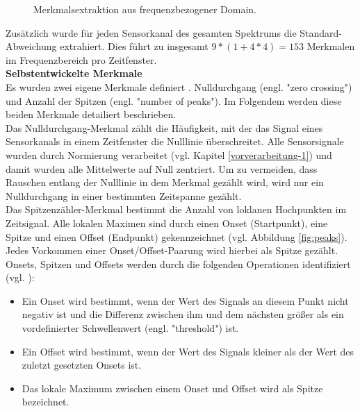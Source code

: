 \begin{figure}[h] 
\caption[Merkmalsextraktion aus frequenzbezogener Domain]{ Merkmalsextraktion aus frequenzbezogener Domain. } 
\label{fig:fft} \end{figure} \vspace{0.5cm}


Zusätzlich wurde für jeden Sensorkanal des gesamten Spektrums die Standard-Abweichung  extrahiert. Dies führt zu insgesamt $9 \ast (1 + 4 \ast 4) = 153$ Merkmalen im Frequenzbereich pro Zeitfenster. \\


\textbf{Selbstentwickelte Merkmale \\}
Es wurden zwei eigene Merkmale definiert \cite{bscpiet}. Nulldurchgang (engl. "zero crossing") und Anzahl der Spitzen (engl. "number of peaks"). Im Folgendem werden diese beiden Merkmale detailiert beschrieben. \\

Das Nulldurchgang-Merkmal zählt die Häufigkeit, mit der das Signal eines Sensorkanals in einem Zeitfenster die Nulllinie überschreitet.
Alle Sensorsignale wurden durch Normierung verarbeitet (vgl. Kapitel \ref{vorverarbeitung-1}) und damit wurden alle Mittelwerte auf Null zentriert.
Um zu vermeiden, dass Rauschen entlang der Nulllinie in dem Merkmal gezählt wird, wird nur ein Nulldurchgang in einer bestimmten Zeitspanne gezählt. \\


Das Spitzenzähler-Merkmal bestimmt die Anzahl von loklanen Hochpunkten im Zeitsignal.
Alle lokalen Maximen sind durch einen Onset (Startpunkt), eine Spitze und einen Offset (Endpunkt) gekennzeichnet (vgl. Abbildung \ref{fig:peaks}). 
Jedes Vorkommen einer Onset/Offset-Paarung wird hierbei als Spitze gezählt.
Onsets, Spitzen und Offsets werden durch die folgenden Operationen identifiziert (vgl. \cite{bscGouverneur}):

\begin{itemize} %
  \item Ein Onset wird bestimmt, wenn der Wert des Signals an diesem Punkt nicht negativ ist und die Differenz zwischen ihm und dem nächsten größer als ein vordefinierter Schwellenwert (engl. "threshold") ist.

  \item Ein Offset wird bestimmt, wenn der Wert des Signals kleiner als der Wert des zuletzt gesetzten Onsets ist.

  \item Das lokale Maximum zwischen einem Onset und Offset wird als Spitze bezeichnet.
\end{itemize} \vspace{0.2cm}


